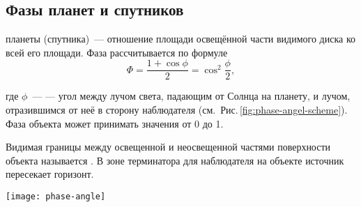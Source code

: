 \subsection{Фазы планет и спутников}

 планеты (спутника)~--- отношение площади освещённой  части видимого диска ко всей его площади.
Фаза рассчитывается по формуле
\begin{equation}
\Phi = \frac{1 + \cos \phi}{2} = \cos^2 \frac{\phi}{2},
\end{equation}
\begin{minipage}{0.67\tw}
где $\phi$~---  --- угол между лучом света, падающим от Солнца на планету, и лучом, отразившимся от неё в сторону наблюдателя (см.~Рис.\,\ref{fig:phase-angel-scheme}). Фаза объекта может принимать значения от 0 до 1.

Видимая границы между освещенной и неосвещенной частями поверхности объекта называется . В зоне терминатора для наблюдателя на объекте источник пересекает горизонт.
\end{minipage}
\hfill
\begin{minipage}{0.31\tw}
	\hfill
	\vspace{-.5pc}
	\texttt{[image: phase-angle]}
	\label{fig:phase-angel-scheme}
\end{minipage}

